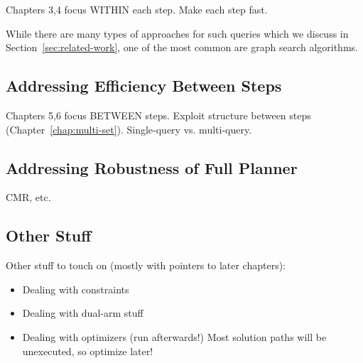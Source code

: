 Chapters 3,4 focus WITHIN each step.
Make each step fast.

While there are many types of approaches for such queries
which we discuss in Section~\ref{sec:related-work},
one of the most common are graph search algorithms.

\subsection{Addressing Efficiency Between Steps}

Chapters 5,6 focus BETWEEN steps.
Exploit structure between steps (Chapter~\ref{chap:multi-set}).
Single-query vs. multi-query.

\subsection{Addressing Robustness of Full Planner}

CMR, etc.

\subsection{Other Stuff}

Other stuff to touch on
(mostly with pointers to later chapters):
\begin{itemize}
\item Dealing with constraints
\item Dealing with dual-arm stuff
\item Dealing with optimizers (run afterwards!)
   Most solution paths will be unexecuted, so optimize later!
\end{itemize}
